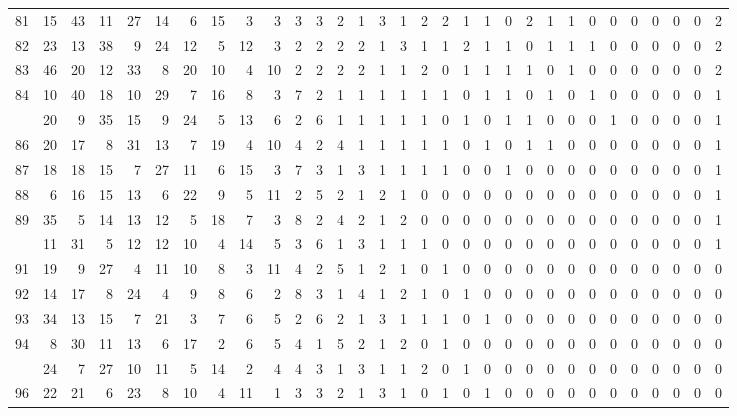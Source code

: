 \documentclass[
]{article}
\begin{document}
\begin{longtable}[t]{lrrrrrrrrrrrrrrrrrrrrrrrrrrrrrr}
81 & 15 & 43 & 11 & 27 & 14 & 6 & 15 & 3 & 3 & 3 & 3 & 2 & 1 & 3 & 1 & 2 & 2 & 1 & 1 & 0 & 2 & 1 & 1 & 0 & 0 & 0 & 0 & 0 & 0 & 2\\
82 & 23 & 13 & 38 & 9 & 24 & 12 & 5 & 12 & 3 & 2 & 2 & 2 & 2 & 1 & 3 & 1 & 1 & 2 & 1 & 1 & 0 & 1 & 1 & 1 & 0 & 0 & 0 & 0 & 0 & 2\\
83 & 46 & 20 & 12 & 33 & 8 & 20 & 10 & 4 & 10 & 2 & 2 & 2 & 2 & 1 & 1 & 2 & 0 & 1 & 1 & 1 & 1 & 0 & 1 & 0 & 0 & 0 & 0 & 0 & 0 & 2\\
84 & 10 & 40 & 18 & 10 & 29 & 7 & 16 & 8 & 3 & 7 & 2 & 1 & 1 & 1 & 1 & 1 & 1 & 0 & 1 & 1 & 0 & 1 & 0 & 1 & 0 & 0 & 0 & 0 & 0 & 1\\
\addlinespace
85 & 20 & 9 & 35 & 15 & 9 & 24 & 5 & 13 & 6 & 2 & 6 & 1 & 1 & 1 & 1 & 1 & 0 & 1 & 0 & 1 & 1 & 0 & 0 & 0 & 1 & 0 & 0 & 0 & 0 & 1\\
86 & 20 & 17 & 8 & 31 & 13 & 7 & 19 & 4 & 10 & 4 & 2 & 4 & 1 & 1 & 1 & 1 & 1 & 0 & 1 & 0 & 1 & 1 & 0 & 0 & 0 & 0 & 0 & 0 & 0 & 1\\
87 & 18 & 18 & 15 & 7 & 27 & 11 & 6 & 15 & 3 & 7 & 3 & 1 & 3 & 1 & 1 & 1 & 1 & 0 & 0 & 1 & 0 & 0 & 0 & 0 & 0 & 0 & 0 & 0 & 0 & 1\\
88 & 6 & 16 & 15 & 13 & 6 & 22 & 9 & 5 & 11 & 2 & 5 & 2 & 1 & 2 & 1 & 0 & 0 & 0 & 0 & 0 & 0 & 0 & 0 & 0 & 0 & 0 & 0 & 0 & 0 & 1\\
89 & 35 & 5 & 14 & 13 & 12 & 5 & 18 & 7 & 3 & 8 & 2 & 4 & 2 & 1 & 2 & 0 & 0 & 0 & 0 & 0 & 0 & 0 & 0 & 0 & 0 & 0 & 0 & 0 & 0 & 1\\
\addlinespace
90 & 11 & 31 & 5 & 12 & 12 & 10 & 4 & 14 & 5 & 3 & 6 & 1 & 3 & 1 & 1 & 1 & 0 & 0 & 0 & 0 & 0 & 0 & 0 & 0 & 0 & 0 & 0 & 0 & 0 & 1\\
91 & 19 & 9 & 27 & 4 & 11 & 10 & 8 & 3 & 11 & 4 & 2 & 5 & 1 & 2 & 1 & 0 & 1 & 0 & 0 & 0 & 0 & 0 & 0 & 0 & 0 & 0 & 0 & 0 & 0 & 0\\
92 & 14 & 17 & 8 & 24 & 4 & 9 & 8 & 6 & 2 & 8 & 3 & 1 & 4 & 1 & 2 & 1 & 0 & 1 & 0 & 0 & 0 & 0 & 0 & 0 & 0 & 0 & 0 & 0 & 0 & 0\\
93 & 34 & 13 & 15 & 7 & 21 & 3 & 7 & 6 & 5 & 2 & 6 & 2 & 1 & 3 & 1 & 1 & 1 & 0 & 1 & 0 & 0 & 0 & 0 & 0 & 0 & 0 & 0 & 0 & 0 & 0\\
94 & 8 & 30 & 11 & 13 & 6 & 17 & 2 & 6 & 5 & 4 & 1 & 5 & 2 & 1 & 2 & 0 & 1 & 0 & 0 & 0 & 0 & 0 & 0 & 0 & 0 & 0 & 0 & 0 & 0 & 0\\
\addlinespace
95 & 24 & 7 & 27 & 10 & 11 & 5 & 14 & 2 & 4 & 4 & 3 & 1 & 3 & 1 & 1 & 2 & 0 & 1 & 0 & 0 & 0 & 0 & 0 & 0 & 0 & 0 & 0 & 0 & 0 & 0\\
96 & 22 & 21 & 6 & 23 & 8 & 10 & 4 & 11 & 1 & 3 & 3 & 2 & 1 & 3 & 1 & 0 & 1 & 0 & 1 & 0 & 0 & 0 & 0 & 0 & 0 & 0 & 0 & 0 & 0 & 0\\

\end{longtable}
\end{document}
